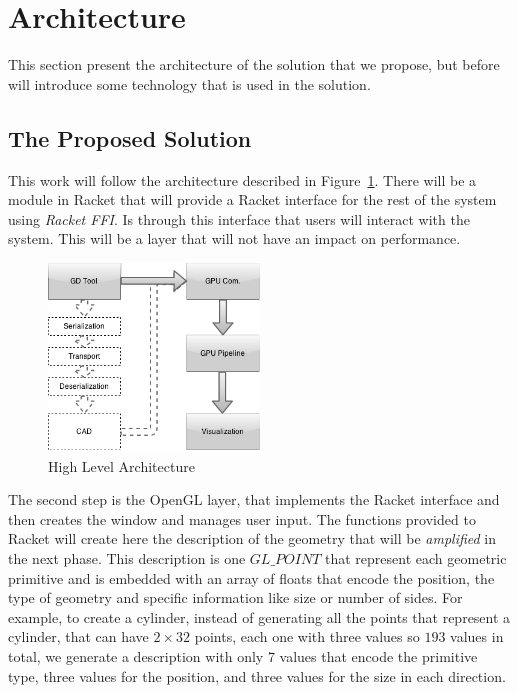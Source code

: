 
%
%

\section{Architecture} %
\label{sec:architecture}

This section present the architecture of the solution that we propose, but before will introduce some technology that is used in the solution.



\subsection{The Proposed Solution} %
\label{sub:solution}

This work will follow the architecture described in Figure~\ref{fig:architecture}.
There will be a module in Racket that will provide a Racket interface for the rest of the system using \emph{Racket FFI}. 
Is through this interface that users will interact with the system. This will be a layer that will not have an impact on performance.


\begin{figure}
	\vspace{-15pt}
    \centering
	\includegraphics[width=0.5\textwidth]{img/Architecture/GD-Fast-Pipeline.png}
	\caption{High Level Architecture}
	\label{fig:architecture}
	\vspace{-15pt}
\end{figure}

The second step is the OpenGL layer, that implements the Racket interface and then creates the window and manages user input. The functions provided to
Racket will create here the description of the geometry that will be \emph{amplified} in the next phase. This description is one $GL\_POINT$ that
represent each geometric primitive and is embedded with an array of floats that encode the position, the type of geometry and specific information like
size or number of sides. For example, to create a cylinder, instead of generating all the points that represent a cylinder, that can have $2\times 32$ points, each one with three values so $193$ values in total, we generate a description with only 7 values that encode the primitive type, three values for the position, and three values for the size in each direction.

